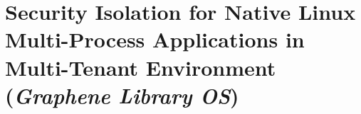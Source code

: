 
\chapter{Security Isolation for Native Linux Multi-Process Applications in Multi-Tenant Environment \\ ({\em Graphene Library OS})}









